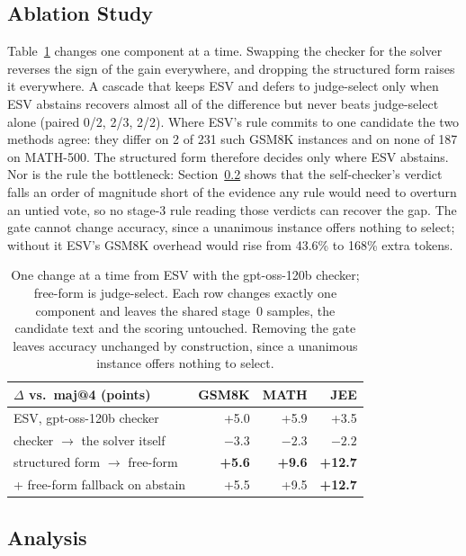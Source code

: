 \documentclass[letterpaper]{article} %
\newcommand{\method}{\textsc{ESV}}   %
\begin{document}
\subsection{Ablation Study}
\label{sec:ablation}

Table~\ref{tab:ablation} changes one component at a time. Swapping the checker for the solver reverses the sign of the gain everywhere, and dropping the structured form raises it everywhere. A cascade that keeps ESV and defers to judge-select only when ESV abstains recovers almost all of the difference but never beats judge-select alone (paired 0/2, 2/3, 2/2). Where ESV's rule commits to one candidate the two methods agree: they differ on 2 of 231 such GSM8K instances and on none of 187 on MATH-500. The structured form therefore decides only where ESV abstains. Nor is the rule the bottleneck: Section~\ref{sec:analysis} shows that the self-checker's verdict falls an order of magnitude short of the evidence any rule would need to overturn an untied vote, so no stage-3 rule reading those verdicts can recover the gap. The gate cannot change accuracy, since a unanimous instance offers nothing to select; without it ESV's GSM8K overhead would rise from 43.6\% to 168\% extra tokens.

\begin{table}[t]
\centering
\small
\setlength{\tabcolsep}{3pt}
\begin{tabular}{lrrr}
\toprule
$\Delta$ vs.\ maj@4 (points) & GSM8K & MATH & JEE \\
\midrule
ESV, gpt-oss-120b checker & +5.0 & +5.9 & +3.5 \\
\quad checker $\to$ the solver itself & $-3.3$ & $-2.3$ & $-2.2$ \\
\quad structured form $\to$ free-form & \textbf{+5.6} & \textbf{+9.6} & \textbf{+12.7} \\
\quad + free-form fallback on abstain & +5.5 & +9.5 & \textbf{+12.7} \\
\bottomrule
\end{tabular}
\caption{One change at a time from \method{} with the gpt-oss-120b checker;
free-form is judge-select. Each row changes exactly one component and leaves the
shared stage~0 samples, the candidate text and the scoring untouched. Removing
the gate leaves accuracy unchanged by construction, since a unanimous instance
offers nothing to select.}
\label{tab:ablation}
\end{table}

\subsection{Analysis}
\label{sec:analysis}
\end{document}
